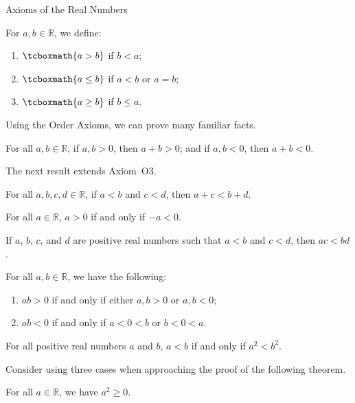 \begin{section}{Axioms of the Real Numbers}
\begin{definition}
For $a,b\in\mathbb{R}$, we define:
\begin{enumerate}[label=\textrm{(\alph*)}]
\item $\tcboxmath{a>b}$ if $b<a$;
\item $\tcboxmath{a\leq b}$ if $a<b$ or $a=b$;
\item $\tcboxmath{a\geq b}$ if $b\leq a$.
\end{enumerate}
\end{definition}

Using the Order Axioms, we can prove many familiar facts. 

\begin{theorem}
For all $a,b\in\mathbb{R}$, if $a,b>0$, then $a+b>0$; and if $a,b<0$, then $a+b<0$.
\end{theorem}

The next result extends Axiom~O3.

\begin{theorem}
For all $a,b,c,d\in\mathbb{R}$, if $a<b$ and $c<d$, then $a+c<b+d$.
\end{theorem}

\begin{theorem}\label{thm:additive inverse of a positive is negative}
For all $a\in\mathbb{R}$, $a>0$ if and only if $-a<0$.
\end{theorem}

\begin{theorem}
If $a$, $b$, $c$, and $d$ are positive real numbers such that $a<b$ and $c<d$, then $ac<bd$.
\end{theorem}

\begin{theorem}
For all $a,b\in\mathbb{R}$, we have the following:
\begin{enumerate}[label=\textrm{(\alph*)}]
\item $ab>0$ if and only if either $a,b>0$ or $a,b<0$;
\item $ab<0$ if and only if $a<0<b$ or $b<0<a$.
\end{enumerate}
\end{theorem}

\begin{theorem}
For all positive real numbers $a$ and $b$, $a< b$ if and only if $a^2< b^2$.
\end{theorem}

Consider using three cases when approaching the proof of the following theorem.

\begin{theorem}
For all $a\in\mathbb{R}$, we have $a^2\geq 0$.
\end{theorem}


\end{section}
